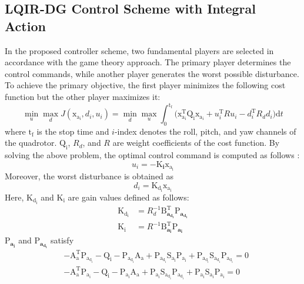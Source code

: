 \documentclass[3p]{elsarticle}
\begin{document}
\subsection{LQIR-DG Control Scheme with Integral Action}
\noindent In the proposed controller scheme, two fundamental players are selected in accordance with the game theory approach. The primary player determines the control commands, while another player generates the worst possible disturbance.
To achieve the primary objective, the first player minimizes the following cost function but the other player maximizes it:
\begin{equation}\label{eq:min_max_cost_function}
    \min_{u} \max_{d} J(\boldsymbol{\mathrm{x_{a_i}}}, {d_i}, {u_i})= \min_{d} \max_{u}
     \int_{0}^{\mathrm{t_f}}\biggl (\boldsymbol{\mathrm{x^\mathrm{T}_{a_i}}}  \boldsymbol{\mathrm{Q_i}} \boldsymbol{\mathrm{x_{a_i}}}+
    {{u^\mathrm{T}_i}}  {{R}} {{u_i}}-
    {{d^\mathrm{T}_{i}}} {{ R_{d} d_{i}}}
    \biggl )\mathrm{d}t
\end{equation}
where $\mathrm{t_f}$ is the stop time and $i$-index denotes the roll, pitch, and yaw channels of the quadrotor. $\boldsymbol{\mathrm{Q_i}}$, ${{R_{d}}}$, and ${{R}}$ are weight coefficients of the cost function.
By solving the above problem, the optimal control command is computed as follows \cite{LQDG}:
\begin{equation}
	{{u_i}} = -\boldsymbol{{\mathrm{K}}_{i}} \boldsymbol{{\mathrm{x_{a_i}}}}
\end{equation}
Moreover, the worst disturbance is obtained as
\begin{equation}
	{{d_i}} =\boldsymbol{{\mathrm{K_{d_i}}}}\boldsymbol{{\mathrm{x_{a_i}}}}
\end{equation}
Here, $\boldsymbol{{\mathrm{K_{d_i}}}}$ and $\boldsymbol{{\mathrm{K_i}}}$ are gain values defined as follows:
\begin{align}
	\boldsymbol{{\mathrm{K_{d_i}}}} &= {{{R}}^{-1}_{d}}\boldsymbol{{\mathrm{B}_{a_{d_i}}^\mathrm{T}}}\boldsymbol{{\mathrm{P}}_{a_{d_i}}}\\
	\boldsymbol{{\mathrm{K_i}}} &= {{{R}}^{-1}}\boldsymbol{{\mathrm{B}_{a_i}^\mathrm{T}}}\boldsymbol{{\mathrm{P}}_{a_i}}
\end{align}
$\boldsymbol{{\mathrm{P}}_{a_i}}$ and $\boldsymbol{{\mathrm{P}}_{a_{d_i}}}$ satisfy
\begin{align}\label{coupled_riccatti_LQIDG}
	&-\boldsymbol{\mathrm{A^\mathrm{T}_a}}\boldsymbol{\mathrm{P_{a_{d_i}}}}
	 - \boldsymbol{\mathrm{Q_{i}}} - \boldsymbol{\mathrm{P_{a_{d_i}}}}\boldsymbol{\mathrm{A_a}} 
	 + \boldsymbol{\mathrm{P_{a_{d_i}}}}\boldsymbol{\mathrm{S_{a_i}}}\boldsymbol{\mathrm{P_{a_i}}}
	  +\boldsymbol{\mathrm{P_{a_{d_i}}}}\boldsymbol{\mathrm{S_{a_{d_i}}}}\boldsymbol{\mathrm{P_{a_{d_i}}}}
	=\boldsymbol{\mathrm{0}}\\
            &-\boldsymbol{\mathrm{A^\mathrm{T}_a}}\boldsymbol{\mathrm{P_{a_i}}} - \boldsymbol{\mathrm{Q_i}}
			 - \boldsymbol{\mathrm{P_{a_i}}}\boldsymbol{\mathrm{A_a}}  +
			  \boldsymbol{\mathrm{P_{a_i}}}\boldsymbol{\mathrm{S_{a_{d_i}}}}\boldsymbol{\mathrm{P_{a_{d_i}}}} 
			  +\boldsymbol{\mathrm{P_{a_i}}}\boldsymbol{\mathrm{S_{a_i}}}\boldsymbol{\mathrm{P_{a_i}}} =\boldsymbol{\mathrm{0}}
\end{align}
\end{document}
